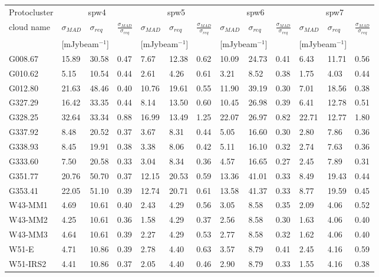 \documentclass[longauth]{aa} %
\newcommand{\tdust}{\mbox{$T_{\rm dust}$}}
\newcommand{\lbol}{\ensuremath{L_{\mathrm{bol}}\xspace}}        %
\begin{document}
\begin{appendix}
\begin{table}[htbp!]
\begin{tabular}{@{\extracolsep{4pt}}lllllllllllll@{}}
\hline \noalign {\smallskip}
Protocluster  & \multicolumn{3}{c}{spw4}  & \multicolumn{3}{c}{spw5}  & \multicolumn{3}{c}{spw6}
    & \multicolumn{3}{c}{spw7}  \\ %
\cline{2-4}\cline{5-7}\cline{8-10}\cline{11-13}
cloud name\tnote{1}  & $\sigma_{MAD}$ & $\sigma_{req}$ & $\frac{\sigma_{MAD}}{\sigma_{req}}$  & $\sigma_{MAD}$ & $\sigma_{req}$ & $\frac{\sigma_{MAD}}{\sigma_{req}}$  & $\sigma_{MAD}$ & $\sigma_{req}$ & $\frac{\sigma_{MAD}}{\sigma_{req}}$  & $\sigma_{MAD}$ & $\sigma_{req}$ & $\frac{\sigma_{MAD}}{\sigma_{req}}$\\
& \multicolumn{2}{c}{[mJybeam$^{-1}$]}& & \multicolumn{2}{c}{[mJybeam$^{-1}$]}& &  \multicolumn{2}{c}{[mJybeam$^{-1}$]}& & \multicolumn{2}{c}{[mJybeam$^{-1}$]}\\
\hline \noalign {\smallskip}
G008.67  &  15.89 & 30.58 & 0.47 & 7.67 & 12.38 & 0.62 & 10.09 & 24.73 & 0.41 & 6.43 & 11.71 & 0.56 \\
G010.62  &  5.15 & 10.54 & 0.44 & 2.61 & 4.26 & 0.61 & 3.21 & 8.52 & 0.38 & 1.75 & 4.03 & 0.44 \\
G012.80  &  21.63 & 48.46 & 0.40 & 10.76 & 19.61 & 0.55 & 11.90 & 39.19 & 0.30 & 7.01 & 18.56 & 0.38 \\
G327.29  &  16.42 & 33.35 & 0.44 & 8.14 & 13.50 & 0.60 & 10.45 & 26.98 & 0.39 & 6.41 & 12.78 & 0.51 \\
G328.25  &  32.64 & 33.34 & 0.88 & 16.99 & 13.49 & 1.25 & 22.07 & 26.97 & 0.82 & 22.71 & 12.77 & 1.80 \\
G337.92  &  8.48 & 20.52 & 0.37 & 3.67 & 8.31 & 0.44 & 5.05 & 16.60 & 0.30 & 2.80 & 7.86 & 0.36 \\
G338.93  &  8.45 & 19.91 & 0.38 & 3.38 & 8.06 & 0.42 & 5.11 & 16.10 & 0.32 & 2.74 & 7.63 & 0.36 \\
G333.60  &  7.50 & 20.58 & 0.33 & 3.04 & 8.34 & 0.36 & 4.57 & 16.65 & 0.27 & 2.45 & 7.89 & 0.31 \\
G351.77  &  20.76 & 50.70 & 0.37 & 12.15 & 20.53 & 0.59 & 13.36 & 41.01 & 0.33 & 8.49 & 19.43 & 0.44 \\
G353.41  &  22.05 & 51.10 & 0.39 & 12.74 & 20.71 & 0.61 & 13.58 & 41.37 & 0.33 & 8.77 & 19.59 & 0.45 \\
W43-MM1  &  4.69 & 10.61 & 0.40 & 2.43 & 4.29 & 0.56 & 3.05 & 8.58 & 0.35 & 2.09 & 4.06 & 0.52 \\
W43-MM2  &  4.25 & 10.61 & 0.36 & 1.58 & 4.29 & 0.37 & 2.56 & 8.58 & 0.30 & 1.63 & 4.06 & 0.40 \\
W43-MM3  &  4.64 & 10.61 & 0.39 & 2.27 & 4.29 & 0.53 & 2.77 & 8.58 & 0.32 & 1.62 & 4.06 & 0.40 \\
W51-E  &  4.71 & 10.86 & 0.39 & 2.78 & 4.40 & 0.63 & 3.57 & 8.79 & 0.41 & 2.45 & 4.16 & 0.59 \\
W51-IRS2  &  4.41 & 10.86 & 0.37 & 2.05 & 4.40 & 0.46 & 2.90 & 8.79 & 0.33 & 1.55 & 4.16 & 0.38 \\


\end{tabular}
\end{table}
\end{appendix}
\end{document}
